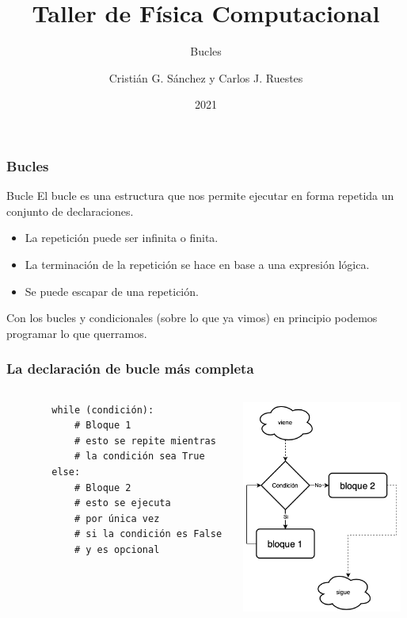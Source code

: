 \documentclass{beamer}
\title{Taller de Física Computacional}
\subtitle{Bucles}
\author{Cristián G. Sánchez y Carlos J. Ruestes}
\date{2021}
\begin{document}
\frame{\titlepage}

\begin{frame}[fragile]
    \frametitle{Bucles}
    \begin{block}{Bucle}
        El bucle es una estructura que nos permite ejecutar en forma repetida un conjunto de declaraciones.
        \begin{itemize}
            \item La repetición puede ser infinita o finita.
            \item La terminación de la repetición se hace en base a una expresión lógica.
            \item Se puede \alert{escapar} de una repetición.
        \end{itemize}
    Con los bucles y condicionales (sobre lo que ya vimos) en principio podemos programar lo que querramos.
    \end{block}
\end{frame}


\begin{frame}[fragile]
    \frametitle{La declaración de bucle más completa}

\begin{columns}
    \begin{column}{0.5\textwidth}
        \begin{verbatim}
        while (condición):
            # Bloque 1
            # esto se repite mientras
            # la condición sea True
        else:
            # Bloque 2
            # esto se ejecuta 
            # por única vez
            # si la condición es False
            # y es opcional
        \end{verbatim}
    \end{column}
    \begin{column}{0.5\textwidth}
        \begin{center}
            \includegraphics[height=7cm]{figuras/flow_while.png}           
        \end{center}    
    \end{column}

\end{columns}
 \end{frame}
\end{document}
